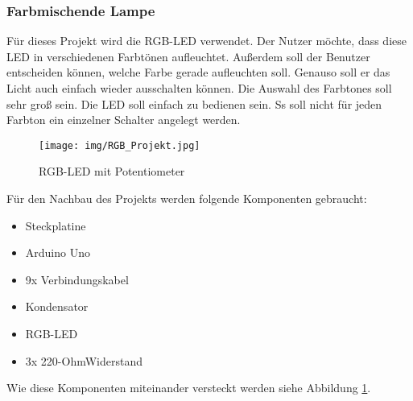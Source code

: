 \subsubsection{Farbmischende Lampe}

Für dieses Projekt wird die RGB-LED verwendet. Der Nutzer möchte, dass diese LED in verschiedenen Farbtönen aufleuchtet. Außerdem soll der Benutzer entscheiden können, welche Farbe gerade aufleuchten soll. Genauso soll er das Licht auch einfach wieder ausschalten können. Die Auswahl des Farbtones  soll sehr groß sein. Die LED soll einfach zu bedienen sein. Ss soll nicht für jeden Farbton ein einzelner Schalter angelegt werden.
\\

\begin{figure}[h]
\begin{center}
\texttt{[image: img/RGB\_Projekt.jpg]}
\caption{RGB-LED mit Potentiometer}
\label{rgb_project}
\end{center}
\end{figure}

Für den Nachbau des Projekts werden folgende Komponenten gebraucht:
\begin{itemize}
\item{Steckplatine}
\item{Arduino Uno}
\item{9x Verbindungskabel}
\item{Kondensator}
\item{RGB-LED}
\item{3x 220-OhmWiderstand}
\end{itemize}
Wie diese Komponenten miteinander versteckt werden siehe Abbildung \ref{rgb_project}.

